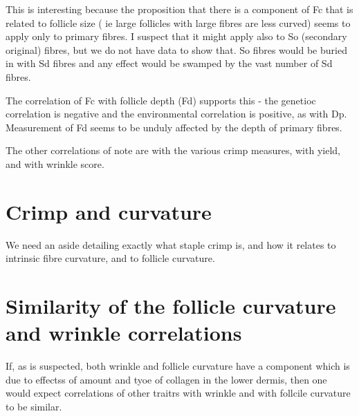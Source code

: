 \documentclass{article}
\begin{document}
This is interesting because the proposition that there is a component of Fc that is related to follicle size  ( ie large follicles with large fibres are less curved) seems to apply only to primary fibres.  I suspect that it might apply also to So (secondary original) fibres, but we do not have data to show that. So fibres would be buried in with Sd fibres and any effect would be swamped by the vast number of Sd fibres.

The correlation of Fc with follicle depth (Fd) supports this - the genetioc correlation is negative and the environmental correlation is positive, as with Dp. Measurement of Fd seems to be unduly affected by the depth of primary fibres. 

The other correlations of note are with the various crimp measures, with yield, and with wrinkle score.

\section{Crimp and curvature}
We need an aside detailing exactly what staple crimp is, and how it relates to intrinsic fibre curvature, and to follicle curvature.

\section{Similarity of the follicle curvature and wrinkle correlations}
If, as is suspected, both wrinkle and follicle curvature have a component which is due to effectss of amount and tyoe of collagen in the lower dermis, then one would expect correlations of other traitrs with wrinkle and with follcile curvature to be similar. 



\end{document}
